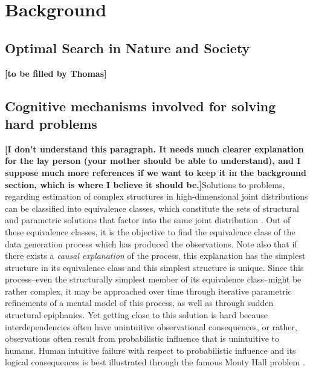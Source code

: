 \section{Background}


\subsection{Optimal Search in Nature and Society}

{\bf [to be filled by Thomas]}

\subsection{Cognitive mechanisms involved for solving hard problems}


{\bf [I don't understand this paragraph. It needs much clearer explanation for the lay person (your mother should be able to understand), and I suppose much more references if we want to keep it in the background section, which is where I believe it should be.]}Solutions to problems, regarding estimation of complex structures in high-dimensional joint distributions can be classified into equivalence classes, which constitute the sets of structural and parametric solutions that factor into the same joint distribution \cite{pearl2009causality, Pearl2009CMR, Koller2009PGM}.  Out of these equivalence classes, it is the objective to find the equivalence class of the data generation process which has produced the observations. Note also that if there exists a {\it causal explanation} of the process, this explanation has the simplest structure in its equivalence class \cite{Koller2009PGM} and this simplest structure is unique.  Since this process--even the structurally simplest member of its equivalence class--might be rather complex, it may be approached over time through iterative parametric refinements of a mental model of this process, as well as through sudden structural epiphanies. Yet getting close to this solution is hard because interdependencies often have unintuitive observational consequences, or rather, observations often result from  probabilistic influence that is unintuitive to humans. Human intuitive failure with respect to probabilistic influence and its logical consequences is best illustrated through the famous Monty Hall problem \cite{Blackburn08Phil, Honderich05Phil, Upton14Statistics, Colman08Psych}. \\

